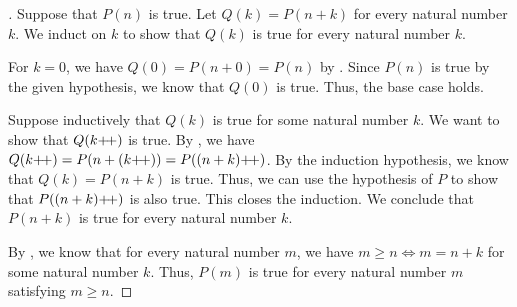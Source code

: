 \begin{proof}[]
  Suppose that \(P(n)\) is true.
  Let \(Q(k) = P(n + k)\) for every natural number \(k\).
  We induct on \(k\) to show that \(Q(k)\) is true for every natural number \(k\).

  For \(k = 0\), we have \(Q(0) = P(n + 0) = P(n)\) by .
  Since \(P(n)\) is true by the given hypothesis, we know that \(Q(0)\) is true.
  Thus, the base case holds.

  Suppose inductively that \(Q(k)\) is true for some natural number \(k\).
  We want to show that \(Q(k{+}\!{+})\) is true.
  By , we have \(Q(k{+}\!{+}) = P(n + (k{+}\!{+})) = P((n + k){+}\!{+})\).
  By the induction hypothesis, we know that \(Q(k) = P(n + k)\) is true.
  Thus, we can use the hypothesis of \(P\) to show that \(P((n + k){+}\!{+})\) is also true.
  This closes the induction.
  We conclude that \(P(n + k)\) is true for every natural number \(k\).

  By , we know that for every natural number \(m\), we have \(m \geq n \iff m = n + k\) for some natural number \(k\).
  Thus, \(P(m)\) is true for every natural number \(m\) satisfying \(m \geq n\).
\end{proof}
